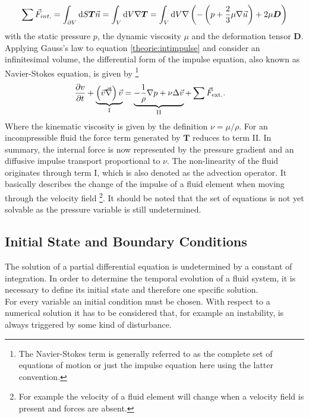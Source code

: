 \begin{align}
    \sum \vec{F}_{int.} = \int_{\partial V}\mathop{}\!\mathrm{d} S \bm{T}\vec{n}  = \int_{V} \mathop{}\!\mathrm{d} V \nabla \bm{T} =
     \int_{V} \mathop{}\!\mathrm{d} V \nabla \left(- \left(p + \frac{2}{3}\mu\nabla\vec{u} \right) + 2\mu \bm{D} \right)
\end{align}
with the static pressure $p$, the dynamic viscosity $\mu$ and the deformation tensor $\bm{D}$.
Applying Gauss's law to equation \ref{theorie:intimpulse} and consider an infinitesimal volume,
the differential form of the impulse equation, also known as Navier-Stokes equation, is given by
\footnote{The Navier-Stokes term is generally referred to as the complete set of equations of motion or
just the impulse equation here using the latter convention.}
\begin{align}
    \label{theorie:eqns}
    \pdn[v]{t} + \underbrace{\left(\vec{v} \vec{\nabla}\right) \vec{v}}_{\text{I}} &= \underbrace{- \frac{1}{\rho} \nabla p + \nu \Delta \vec{v}}_{\text{II}} +\sum \vec{F}_{\text{ext.}}.
\end{align}
Where  the kinematic viscosity is given by the definition $\nu = \mu/\rho$.
For an incompressible fluid the force term generated by $\bm{T}$ reduces to term \RN{2}.
In summary, the internal force is now represented by the pressure gradient and an diffusive impulse transport proportional to $\nu$.
The non-linearity of the fluid originates through term \RN{1}, which is also denoted as the advection operator.
It basically describes the change of the impulse of a fluid element when moving through the velocity field
\footnote{For example the velocity of a fluid element will change when a velocity field is present and forces are absent.}.
It should be noted that the set of equations is not yet solvable as the pressure variable is still undetermined.

\subsection{Initial State and Boundary Conditions}

The solution of a partial differential equation is undetermined by a constant of integration.
In order to determine the temporal evolution of a fluid system, it is necessary to define its initial state and therefore
one specific solution.\\
For every variable an initial condition must be chosen.
With respect to a numerical solution it has to be considered that, for example an instability, is always triggered by some kind of disturbance.

